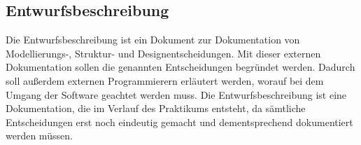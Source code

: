\subsection{Entwurfsbeschreibung}
Die Entwurfsbeschreibung ist ein Dokument zur Dokumentation von Modellierungs-, Struktur- und Designentscheidungen. Mit dieser externen Dokumentation sollen die genannten Entscheidungen begründet werden. Dadurch soll außerdem externen Programmierern erläutert werden, worauf bei dem Umgang der Software geachtet werden muss. Die Entwurfsbeschreibung ist eine Dokumentation, die im Verlauf des Praktikums entsteht, da sämtliche Entscheidungen erst noch eindeutig gemacht und dementsprechend dokumentiert werden müssen.